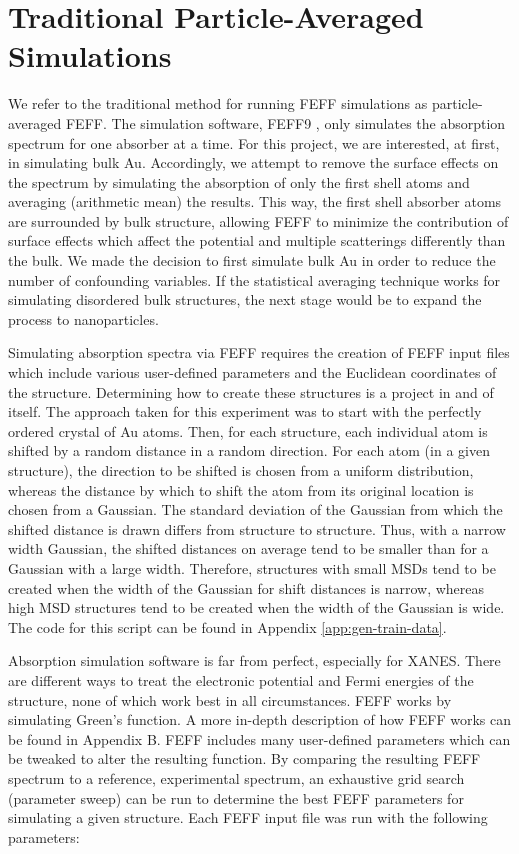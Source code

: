 \section{Traditional Particle-Averaged Simulations} 
\label{sec:traditional-disorder}
We refer to the traditional method for running FEFF simulations as particle-averaged FEFF. The simulation software, FEFF9 \cite{feff-citation}, only simulates the absorption spectrum for one absorber at a time. For this project, we are interested, at first, in simulating bulk Au. Accordingly, we attempt to remove the surface effects on the spectrum by simulating the absorption of only the first shell atoms and averaging (arithmetic mean) the results. This way, the first shell absorber atoms are surrounded by bulk structure, allowing FEFF to minimize the contribution of surface effects which affect the potential and multiple scatterings differently than the bulk. We made the decision to first simulate bulk Au in order to reduce the number of confounding variables. If the statistical averaging technique works for simulating disordered bulk structures, the next stage would be to expand the process to nanoparticles. 

Simulating absorption spectra via FEFF requires the creation of FEFF input files which include various user-defined parameters and the Euclidean coordinates of the structure. Determining how to create these structures is a project in and of itself. The approach taken for this experiment was to start with the perfectly ordered crystal of Au atoms. Then, for each structure, each individual atom is shifted by a random distance in a random direction. For each atom (in a given structure), the direction to be shifted is chosen from a uniform distribution, whereas the distance by which to shift the atom from its original location is chosen from a Gaussian. The standard deviation of the Gaussian from which the shifted distance is drawn differs from structure to structure. Thus, with a narrow width Gaussian, the shifted distances on average tend to be smaller than for a Gaussian with a large width. Therefore, structures with small MSDs tend to be created when the width of the Gaussian for shift distances is narrow, whereas high MSD structures tend to be created when the width of the Gaussian is wide. The code for this script can be found in Appendix \ref{app:gen-train-data}.

Absorption simulation software is far from perfect, especially for XANES. There are different ways to treat the electronic potential and Fermi energies of the structure, none of which work best in all circumstances. FEFF works by simulating Green's function. A more in-depth description of how FEFF works can be found in Appendix B. FEFF includes many user-defined parameters which can be tweaked to alter the resulting function. By comparing the resulting FEFF spectrum to a reference, experimental spectrum, an exhaustive grid search (parameter sweep) can be run to determine the best FEFF parameters for simulating a given structure. Each FEFF input file was run with the following parameters:

